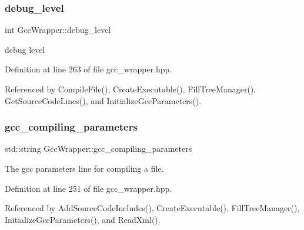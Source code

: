 \mbox{\label{classGccWrapper_aea072d54f5b88f2dabd9cf0b2d87fb86}} 
\subsubsection{\texorpdfstring{debug\+\_\+level}{debug\_level}}
{\footnotesize\ttfamily int Gcc\+Wrapper\+::debug\+\_\+level\hspace{0.3cm}{\ttfamily [private]}}



debug level 



Definition at line 263 of file gcc\+\_\+wrapper.\+hpp.



Referenced by Compile\+File(), Create\+Executable(), Fill\+Tree\+Manager(), Get\+Source\+Code\+Lines(), and Initialize\+Gcc\+Parameters().

\mbox{\label{classGccWrapper_aeffcdf6e69bf53f0de5f019ad102f879}} 
\subsubsection{\texorpdfstring{gcc\+\_\+compiling\+\_\+parameters}{gcc\_compiling\_parameters}}
{\footnotesize\ttfamily std\+::string Gcc\+Wrapper\+::gcc\+\_\+compiling\+\_\+parameters\hspace{0.3cm}{\ttfamily [private]}}



The gcc parameters line for compiling a file. 



Definition at line 251 of file gcc\+\_\+wrapper.\+hpp.



Referenced by Add\+Source\+Code\+Includes(), Create\+Executable(), Fill\+Tree\+Manager(), Initialize\+Gcc\+Parameters(), and Read\+Xml().

\mbox{\label{classGccWrapper_a73c1cdd4e9d5004d193fd3af499b10fe}} 
